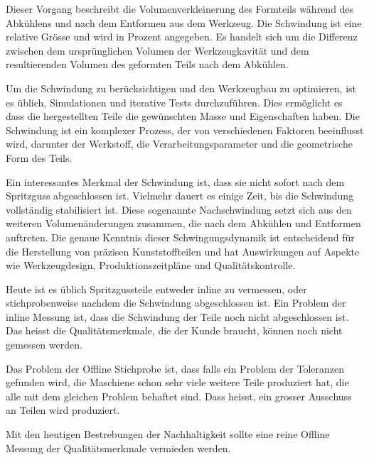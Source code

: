 Dieser Vorgang beschreibt die Volumenverkleinerung des Formteils während des Abkühlens und nach dem Entformen aus dem Werkzeug. Die Schwindung ist eine relative Grösse und wird in Prozent angegeben. Es handelt sich um die Differenz zwischen dem ursprünglichen Volumen der Werkzeugkavität und dem resultierenden Volumen des geformten Teils nach dem Abkühlen.

Um die Schwindung zu berücksichtigen und den Werkzeugbau zu optimieren, ist es üblich, Simulationen und iterative Tests durchzuführen. Dies ermöglicht es  dass die hergestellten Teile die gewünschten Masse und Eigenschaften haben. Die Schwindung ist ein komplexer Prozess, der von verschiedenen Faktoren beeinflusst wird, darunter der Werkstoff, die Verarbeitungsparameter und die geometrische Form des Teils.

Ein interessantes Merkmal der Schwindung ist, dass sie nicht sofort nach dem Spritzguss abgeschlossen ist. Vielmehr dauert es einige Zeit, bis die Schwindung vollständig stabilisiert ist. Diese sogenannte Nachschwindung setzt sich aus den weiteren Volumenänderungen zusammen, die nach dem Abkühlen und Entformen auftreten. Die genaue Kenntnis dieser Schwingungsdynamik ist entscheidend für die Herstellung von präzisen Kunststoffteilen und hat Auswirkungen auf Aspekte wie Werkzeugdesign, Produktionszeitpläne und Qualitätskontrolle.

Heute ist es üblich Spritzgussteile entweder inline zu vermessen, oder stichprobenweise nachdem die Schwindung abgeschlossen ist. Ein Problem der inline Messung ist, dass die Schwindung der Teile noch nicht abgeschlossen ist. Das heisst die Qualitätsmerkmale, die der Kunde braucht, können noch nicht gemessen werden.

Das Problem der Offline Stichprobe ist, dass falls ein Problem der Toleranzen gefunden wird, die Maschiene schon sehr viele weitere Teile produziert hat, die alle mit dem gleichen Problem behaftet sind. Dass heisst, ein grosser Ausschuss an Teilen wird produziert.

Mit den heutigen Bestrebungen der Nachhaltigkeit sollte eine reine Offline Messung der Qualitätsmerkmale vermieden werden.

